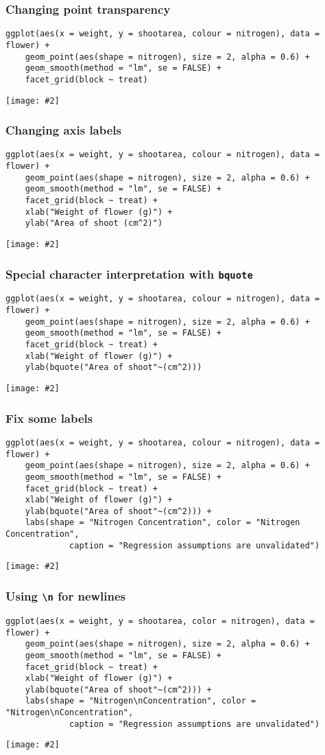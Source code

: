 \documentclass{beamer}
\newcommand{\fig}[2]{\centerline{\texttt{[image: \#2]}}}
\newcommand{\bfr}[1]{\begin{frame}[fragile]\frametitle{{ #1 }}}
\begin{document}
\bfr{Changing point transparency}
\scriptsize
\begin{verbatim}
ggplot(aes(x = weight, y = shootarea, colour = nitrogen), data = flower) +
    geom_point(aes(shape = nitrogen), size = 2, alpha = 0.6) +
    geom_smooth(method = "lm", se = FALSE) +
    facet_grid(block ~ treat)
\end{verbatim}
\fig{.8}{change-alpha-1.png}
\end{frame}


\bfr{Changing axis labels}
\scriptsize
\begin{verbatim}
ggplot(aes(x = weight, y = shootarea, colour = nitrogen), data = flower) +
    geom_point(aes(shape = nitrogen), size = 2, alpha = 0.6) +
    geom_smooth(method = "lm", se = FALSE) +
    facet_grid(block ~ treat) +
    xlab("Weight of flower (g)") +
    ylab("Area of shoot (cm^2)")
\end{verbatim}
\fig{.7}{axis-labels-1.png}
\end{frame}


\bfr{Special character interpretation with {\tt bquote}}
\scriptsize
\begin{verbatim}
ggplot(aes(x = weight, y = shootarea, colour = nitrogen), data = flower) +
    geom_point(aes(shape = nitrogen), size = 2, alpha = 0.6) +
    geom_smooth(method = "lm", se = FALSE) +
    facet_grid(block ~ treat) +
    xlab("Weight of flower (g)") +
    ylab(bquote("Area of shoot"~(cm^2)))
\end{verbatim}
\fig{.7}{bquote-1.png}
\end{frame}


\bfr{Fix some labels}
\scriptsize
\begin{verbatim}
ggplot(aes(x = weight, y = shootarea, colour = nitrogen), data = flower) +
    geom_point(aes(shape = nitrogen), size = 2, alpha = 0.6) +
    geom_smooth(method = "lm", se = FALSE) +
    facet_grid(block ~ treat) +
    xlab("Weight of flower (g)") +
    ylab(bquote("Area of shoot"~(cm^2))) +
    labs(shape = "Nitrogen Concentration", color = "Nitrogen Concentration", 
             caption = "Regression assumptions are unvalidated")
\end{verbatim}
\fig{.6}{extra-labels-1.png}
\end{frame}

\bfr{Using {\tt \textbackslash n} for newlines}
\scriptsize
\begin{verbatim}
ggplot(aes(x = weight, y = shootarea, color = nitrogen), data = flower) +
    geom_point(aes(shape = nitrogen), size = 2, alpha = 0.6) +
    geom_smooth(method = "lm", se = FALSE) +
    facet_grid(block ~ treat) +
    xlab("Weight of flower (g)") +
    ylab(bquote("Area of shoot"~(cm^2))) +
    labs(shape = "Nitrogen\nConcentration", color = "Nitrogen\nConcentration", 
             caption = "Regression assumptions are unvalidated")
\end{verbatim}
\fig{.6}{compact-labels-1.png}
\end{frame}
\end{document}
